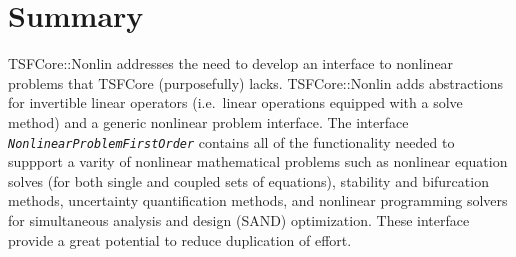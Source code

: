 %
\section{Summary}
%

TSFCore::Nonlin addresses the need to develop an interface to
nonlinear problems that TSFCore (purposefully) lacks.  TSFCore::Nonlin
adds abstractions for invertible linear operators (i.e.~linear
operations equipped with a solve method) and a generic nonlinear
problem interface.  The interface
\texttt{\textit{Nonlinear\-Problem\-First\-Order}} contains
all of the functionality needed to suppport a varity of nonlinear
mathematical problems such as nonlinear equation solves (for both
single and coupled sets of equations), stability and bifurcation
methods, uncertainty quantification methods, and nonlinear programming
solvers for simultaneous analysis and design (SAND) optimization.
These interface provide a great potential to reduce duplication of
effort.



